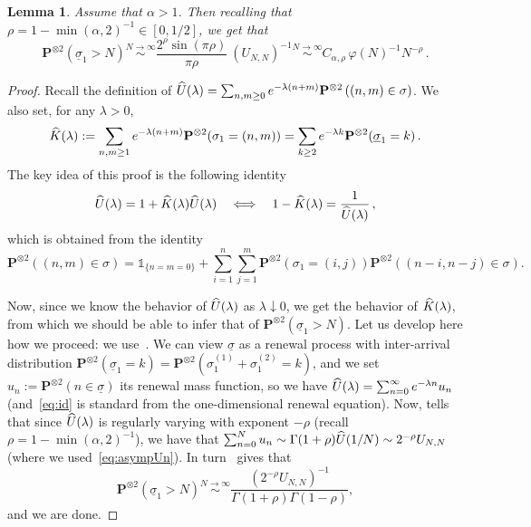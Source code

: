 \documentclass[10pt]{amsart}
\newtheorem{lemm}[theo]{Lemma}\newtheorem{prop}[theo]{Proposition}\newtheorem{coro}[theo]{Corollary}\newtheorem{conj}[theo]{Conjecture}
\theoremstyle{definition}\newtheorem{defi}[theo]{Definition}\newtheorem{rema}[theo]{Remark}\newtheorem{exam}[theo]{Example}\newtheorem{exem}[theo]{Example}\newtheorem{nota}[theo]{Notation}
\newcommand{\ga}{\alpha}
\newcommand{\gl}{\lambda}
\newcommand{\unbf}%
{\mathds{1}}
\let\oldhat\hat
\renewcommand*{\hat}[1]{\mathchoice{\widehat{#1}}{\widehat{#1}}{\oldhat{#1}}{\oldhat{#1}}}
\newcommand{\bP}{\ensuremath{\mathbf{P}}}
\begin{document}
\begin{appendix}
\begin{lemm}\label{lem:tau1}
Assume that $\ga>1$. Then recalling that $\rho=1-\min(\ga,2)^{-1} \in[0,1/2]$, we get that
\begin{equation}
\bP^{\otimes 2} \left(\underline{\sigma}_1 > N \right) \stackrel{N \to \infty}\sim \frac{2^{\rho} \sin(\pi \rho)}{ \pi \rho} \ (U_{N,N})^{-1} \stackrel{N \to \infty}\sim C_{\ga,\rho}\,\varphi(N)^{-1} N^{-\rho}\,.
\end{equation}
\end{lemm}

\begin{proof}
Recall the definition of $\hat U (\gl) = \sum_{n,m \ge 0} e^{- \lambda (n+m)} \bP^{\otimes 2} \left((n,m) \in \sigma \right) $. We also set, for any $\gl>0$,
\begin{equation}
\hat{K}(\lambda) := \sum_{n,m \ge 1} e^{- \lambda (n+m)} \bP^{\otimes 2} (\sigma_1 = (n,m)) = \sum_{k \ge 2} e^{- \lambda k} \bP^{\otimes 2} (\underline{\sigma}_1 = k)\,.
\end{equation}
The key idea of this proof is the following identity
\begin{equation}\label{eq:id}
\hat U(\gl) = 1+ \hat K(\gl) \hat U(\gl) \quad\Longleftrightarrow \quad 1- \hat{K}(\lambda) = \frac{1}{\hat{U}(\lambda)}\,,
\end{equation}
which is obtained from the identity
\begin{equation}
\bP^{\otimes 2} \left((n,m) \in \sigma \right) = \unbf_{\{n=m=0\}} + \sum_{i=1}^{n}\sum_{j=1}^{m} \bP^{\otimes 2} (\sigma_1 = (i,j)) \bP^{\otimes 2} ((n-i,n-j) \in\sigma).\!
\end{equation}

Now, since we know the behavior of $\hat U(\gl)$ as $\gl\downarrow0$, we get the behavior of $\hat K(\gl)$, from which we should be able to infer that of $\bP^{\otimes 2}(\underline \sigma_1 >N)$. Let us develop here how we proceed: we use~\cite[Corollary~1.7.3 and Theorem~8.7.3]{cf:BGT}. We can view $\underline\sigma$ as a renewal process with inter-arrival distribution $\bP^{\otimes 2} (\underline \sigma_1=k) = \bP^{\otimes 2} (\sigma_1^{(1)} + \sigma_1^{(2)}=k)$, and we set $u_n:= \bP^{\otimes 2} (n \in \underline \sigma)$ its renewal mass function, so we have $\hat U(\gl) = \sum_{n=0}^{\infty} e^{-\gl n} u_n$ (and~\eqref{eq:id} is standard from the one-dimensional renewal equation). Now, \cite[Corollary~1.7.3]{cf:BGT} tells that since $\hat U(\gl)$ is regularly varying with exponent $-\rho$ (recall $\rho = 1-\min(\ga,2)^{-1}$), we have that $\sum_{n=0}^N u_n \sim \Gamma(1+\rho) \hat U(1/N) \sim 2^{-\rho} U_{N,N}$ (where we used~\eqref{eq:asympUn}). In turn~\cite[Theorem~8.7.3]{cf:BGT} gives that
\[
\bP^{\otimes 2} (\underline\sigma _1 >N) \stackrel{N\to\infty}{\sim} \frac{(2^{-\rho} U_{N,N})^{-1}}{\Gamma(1+\rho) \Gamma(1-\rho)},
\]
and we are done.
\end{proof}


\end{appendix}
\end{document}
